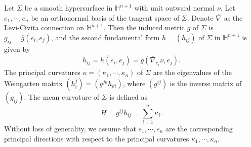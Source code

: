 \documentclass[11pt,reqno]{amsart}
\theoremstyle{definition}
\theoremstyle{remark}
\numberwithin{equation}{section}
\renewcommand{\(}{\left(}
\renewcommand{\)}{\right)}
\renewcommand{\~}{\widetilde}
\renewcommand{\-}{\overline}
\renewcommand{\k}{\kappa}
\begin{document}
Let $\Sigma$ be a smooth hypersurface in $\mathbb H^{n+1}$ with unit outward normal $\nu$.  Let $e_1,\cdots,e_n$ be an orthonormal basis of the tangent space of $\Sigma$. Denote $\overline{\nabla}$ as the Levi-Civita connection on $\mathbb{H}^{n+1}$. Then the induced metric $g$ of $\Sigma$ is $g_{ij}=\-g(e_i,e_j)$, and the second fundamental form $h=(h_{ij})$ of $\Sigma$ in $\mathbb H^{n+1}$ is given by
\begin{align*}
h_{ij}=h(e_i,e_j)=\bar{g}(\-\nabla_{e_i} \nu,e_j).
\end{align*}
The principal curvatures $\k=(\k_1,\cdots,\k_n)$ of $\Sigma$ are the eigenvalues of the Weingarten matrix $(h_i^j)=(g^{jk}h_{ki})$, where $(g^{ij})$ is the inverse matrix of $(g_{ij})$. The mean curvature of $\Sigma$ is defined as
\begin{equation*}
  H=g^{ij}h_{ij}=\sum_{i=1}^{n}\kappa_i.
\end{equation*}
 Without loss of generality, we assume that $e_1,\cdots,e_n$ are the corresponding principal directions with respect to the principal curvatures $\k_1,\cdots,\k_n$.
\end{document}
